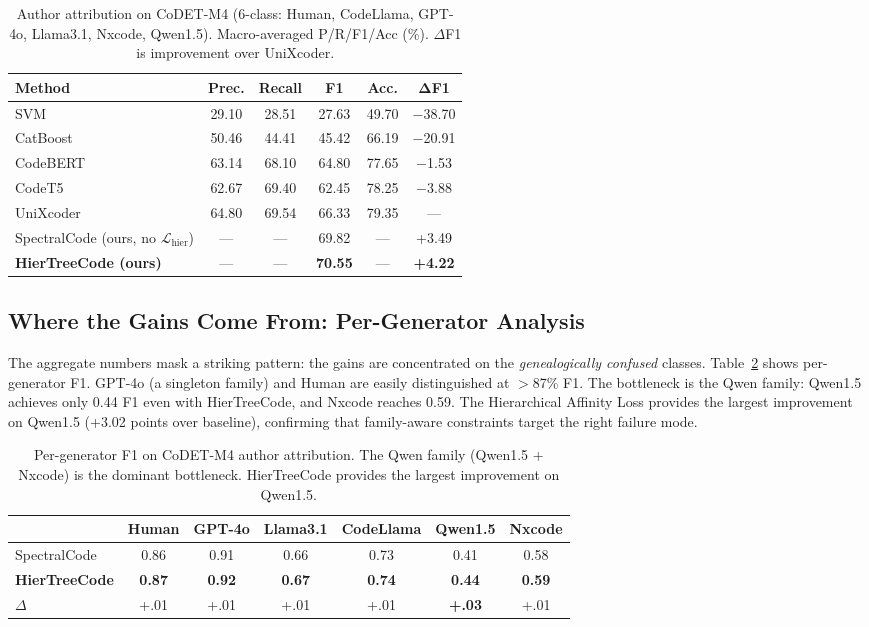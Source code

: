 \documentclass{article}
\begin{document}
\begin{table}[t]
\caption{Author attribution on CoDET-M4 (6-class: Human, CodeLlama, GPT-4o, Llama3.1, Nxcode, Qwen1.5). Macro-averaged P/R/F1/Acc (\%). $\Delta$F1 is improvement over UniXcoder.}
\label{tab:author_main}
\centering
\small
\begin{tabular}{lcccc|c}
\toprule
\textbf{Method} & \textbf{Prec.} & \textbf{Recall} & \textbf{F1} & \textbf{Acc.} & $\boldsymbol{\Delta}$\textbf{F1} \\
\midrule
SVM & 29.10 & 28.51 & 27.63 & 49.70 & $-$38.70 \\
CatBoost & 50.46 & 44.41 & 45.42 & 66.19 & $-$20.91 \\
CodeBERT & 63.14 & 68.10 & 64.80 & 77.65 & $-$1.53 \\
CodeT5 & 62.67 & 69.40 & 62.45 & 78.25 & $-$3.88 \\
UniXcoder & 64.80 & 69.54 & 66.33 & 79.35 & --- \\
\midrule
SpectralCode {\scriptsize (ours, no $\mathcal{L}_{\text{hier}}$)} & --- & --- & 69.82 & --- & +3.49 \\
\rowcolor{ours}
\textbf{HierTreeCode (ours)} & --- & --- & \textbf{70.55} & --- & \textbf{+4.22} \\
\bottomrule
\end{tabular}
\end{table}


\subsection{Where the Gains Come From: Per-Generator Analysis}

The aggregate numbers mask a striking pattern: the gains are concentrated on the \emph{genealogically confused} classes. Table~\ref{tab:per_gen} shows per-generator F1. GPT-4o (a singleton family) and Human are easily distinguished at $>$87\% F1. The bottleneck is the Qwen family: Qwen1.5 achieves only 0.44 F1 even with HierTreeCode, and Nxcode reaches 0.59. The Hierarchical Affinity Loss provides the largest improvement on Qwen1.5 (+3.02 points over baseline), confirming that family-aware constraints target the right failure mode.

\begin{table}[t]
\caption{Per-generator F1 on CoDET-M4 author attribution. The Qwen family (Qwen1.5 + Nxcode) is the dominant bottleneck. HierTreeCode provides the largest improvement on Qwen1.5.}
\label{tab:per_gen}
\centering
\small
\begin{tabular}{lcccccc}
\toprule
& \textbf{Human} & \textbf{GPT-4o} & \textbf{Llama3.1} & \textbf{CodeLlama} & \textbf{Qwen1.5} & \textbf{Nxcode} \\
\midrule
SpectralCode & 0.86 & 0.91 & 0.66 & 0.73 & 0.41 & 0.58 \\
\rowcolor{ours}
\textbf{HierTreeCode} & \textbf{0.87} & \textbf{0.92} & \textbf{0.67} & \textbf{0.74} & \textbf{0.44} & \textbf{0.59} \\
\midrule
$\Delta$ & +.01 & +.01 & +.01 & +.01 & \textcolor{gain}{\textbf{+.03}} & +.01 \\
\bottomrule
\end{tabular}
\end{table}
\end{document}
